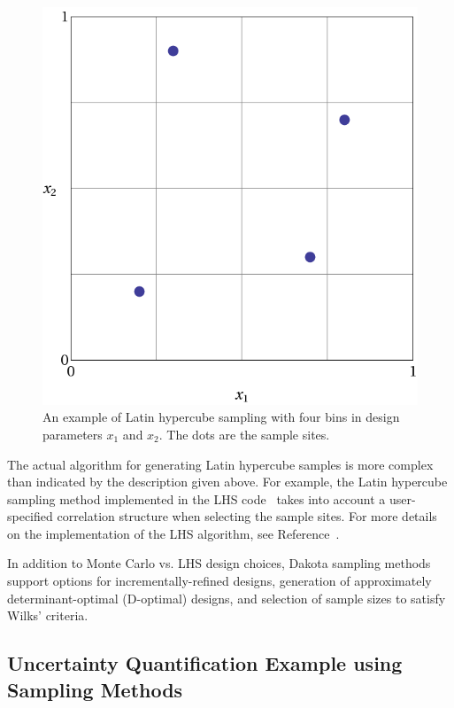 \begin{figure}[htbp!]
  \centering
  \includegraphics[scale=0.35]{images/lhs_graphic}
  \caption{An example of Latin hypercube sampling with four bins in
    design parameters $x_1$ and $x_2$. The dots
    are the sample sites.}
  \label{dace:figure01}
\end{figure}

The actual algorithm for generating Latin hypercube samples is more
complex than indicated by the description given above. For example,
the Latin hypercube sampling method implemented in the LHS
code~\cite{Swi04} takes into account a user-specified correlation
structure when selecting the sample sites. For more details on the
implementation of the LHS algorithm, see Reference~\cite{Swi04}.

In addition to Monte Carlo vs. LHS design choices, Dakota sampling
methods support options for incrementally-refined designs, generation
of approximately determinant-optimal (D-optimal) designs, and
selection of sample sizes to satisfy Wilks' criteria.

\subsection{Uncertainty Quantification Example using Sampling Methods}\label{uq:uncertainty1}

